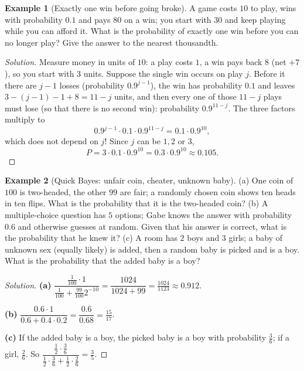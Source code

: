 \documentclass[11pt]{article}
\theoremstyle{definition}
\newtheorem{example}{Example}[section]
\begin{document}
\begin{example}[Exactly one win before going broke]
A game costs $10$ to play, wins with probability $0.1$ and pays $80$ on a win; you start with $30$ and keep playing while you can afford it. What is the probability of exactly one win before you can no longer play? Give the answer to the nearest thousandth.
\end{example}

\begin{proof}[Solution]
Measure money in units of $10$: a play costs $1$, a win pays back $8$ (net $+7$), so you start with $3$ units. Suppose the single win occurs on play $j$. Before it there are $j-1$ losses (probability $0.9^{j-1}$), the win has probability $0.1$ and leaves $3-(j-1)-1+8=11-j$ units, and then every one of those $11-j$ plays must lose (so that there is no second win): probability $0.9^{11-j}$. The three factors multiply to
\[
0.9^{j-1}\cdot0.1\cdot0.9^{11-j}=0.1\cdot0.9^{10},
\]
which does not depend on $j$! Since $j$ can be $1,2$ or $3$,
\[
P=3\cdot0.1\cdot0.9^{10}=0.3\cdot0.9^{10}\approx\boxed{0.105}.
\]
\end{proof}

\begin{example}[Quick Bayes: unfair coin, cheater, unknown baby]
(a) One coin of $100$ is two-headed, the other $99$ are fair; a randomly chosen coin shows ten heads in ten flips. What is the probability that it is the two-headed coin? (b) A multiple-choice question has $5$ options; Gabe knows the answer with probability $0.6$ and otherwise guesses at random. Given that his answer is correct, what is the probability that he knew it? (c) A room has $2$ boys and $3$ girls; a baby of unknown sex (equally likely) is added, then a random baby is picked and is a boy. What is the probability that the added baby is a boy?
\end{example}

\begin{proof}[Solution]
\textbf{(a)} $\dfrac{\frac1{100}\cdot1}{\frac1{100}+\frac{99}{100}2^{-10}}=\dfrac{1024}{1024+99}=\boxed{\tfrac{1024}{1123}\approx0.912}$.

\textbf{(b)} $\dfrac{0.6\cdot1}{0.6+0.4\cdot0.2}=\dfrac{0.6}{0.68}=\boxed{\tfrac{15}{17}}$.

\textbf{(c)} If the added baby is a boy, the picked baby is a boy with probability $\tfrac36$; if a girl, $\tfrac26$. So $\dfrac{\frac12\cdot\frac36}{\frac12\cdot\frac36+\frac12\cdot\frac26}=\boxed{\tfrac35}$.
\end{proof}
\end{document}
